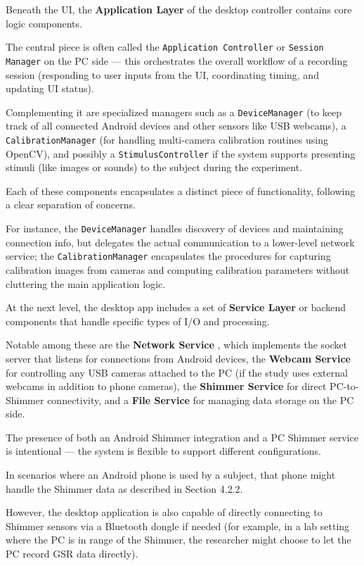 Beneath the UI, the \textbf{Application Layer}
 of the desktop controller contains core logic components.

The central piece is often called the \texttt{Application Controller} or \texttt{Session Manager} on the PC side --- this orchestrates the overall workflow of a recording session (responding to user inputs from the UI, coordinating timing, and updating UI status).

Complementing it are specialized managers such as a \texttt{DeviceManager} (to keep track of all connected Android devices and other sensors like USB webcams), a \texttt{CalibrationManager} (for handling multi-camera calibration routines using OpenCV), and possibly a \texttt{StimulusController} if the system supports presenting stimuli (like images or sounds) to the subject during the experiment.

Each of these components encapsulates a distinct piece of functionality, following a clear separation of concerns.

For instance, the \texttt{DeviceManager} handles discovery of devices and maintaining connection info, but delegates the actual communication to a lower-level network service; the \texttt{CalibrationManager} encapsulates the procedures for capturing calibration images from cameras and computing calibration parameters without cluttering the main application logic.

At the next level, the desktop app includes a set of \textbf{Service Layer}
 or backend components that handle specific types of I/O and processing.

Notable among these are the \textbf{Network Service}
, which implements the socket server that listens for connections from Android devices, the \textbf{Webcam Service}
 for controlling any USB cameras attached to the PC (if the study uses external webcams in addition to phone cameras), the \textbf{Shimmer Service}
 for direct PC-to-Shimmer connectivity, and a \textbf{File Service}
 for managing data storage on the PC side.

The presence of both an Android Shimmer integration and a PC Shimmer service is intentional --- the system is flexible to support different configurations.

In scenarios where an Android phone is used by a subject, that phone might handle the Shimmer data as described in Section 4.2.2.

However, the desktop application is also capable of directly connecting to Shimmer sensors via a Bluetooth dongle if needed (for example, in a lab setting where the PC is in range of the Shimmer, the researcher might choose to let the PC record GSR data directly).

